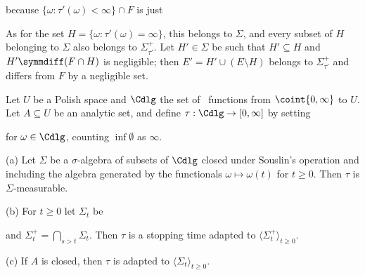 {

\noindent because $\{\omega:\tau'(\omega)<\infty\}\cap F$ is just


\noindent As for the set $H=\{\omega:\tau'(\omega)=\infty\}$, this belongs
to $\Sigma$, and every subset of $H$ belonging to $\Sigma$ also belongs to
$\Sigma^+_{\tau'}$.   Let $H'\in\Sigma$ be such that $H'\subseteq H$ and
$H'\symmdiff(F\cap H)$ is negligible;  then $E'=H'\cup(E\setminus H)$
belongs to $\Sigma^+_{\tau'}$ and differs from $F$ by a negligible set.\
\Qed}

  Let $U$ be a Polish
space and $\Cdlg$ the set of \cadlag\ functions from $\coint{0,\infty}$ to
$U$.   Let $A\subseteq U$ be an analytic set, and define
$\tau:\Cdlg\to[0,\infty]$ by setting


\noindent for $\omega\in\Cdlg$, counting $\inf\emptyset$ as $\infty$.

(a) Let $\Sigma$ be a $\sigma$-algebra of subsets of $\Cdlg$ closed
under Souslin's operation and including the algebra generated by the
functionals $\omega\mapsto\omega(t)$ for $t\ge 0$.   Then $\tau$ is
$\Sigma$-measurable.

(b) For $t\ge 0$ let $\Sigma_t$ be


\noindent and $\Sigma_t^+=\bigcap_{s>t}\Sigma_t$.   Then $\tau$ is a
stopping time adapted to $\langle\Sigma^+_t\rangle_{t\ge 0}$.

(c) If $A$ is closed, then $\tau$ is adapted to
$\langle\Sigma_t\rangle_{t\ge 0}$.

